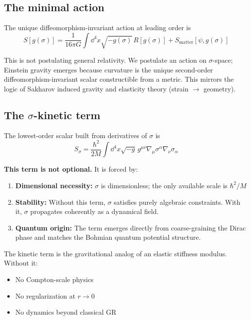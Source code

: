 \documentclass[11pt,a4paper]{article}
\theoremstyle{definition}
\theoremstyle{remark}
\begin{document}
	\subsection{The minimal action}
	
	The unique diffeomorphism-invariant action at leading order is
	\begin{equation}
		S[g(\sigma)] = \frac{1}{16\pi G}\int \dd^4x \sqrt{-g(\sigma)} \, R[g(\sigma)] + S_{\text{matter}}[\psi, g(\sigma)]
		\label{eq:minimal_action}
	\end{equation}
	
	This is not postulating general relativity. We postulate an action on $\sigma$-space; Einstein gravity emerges because curvature is the unique second-order diffeomorphism-invariant scalar constructible from a metric. This mirrors the logic of Sakharov induced gravity and elasticity theory (strain $\to$ geometry).
	
	\subsection{The $\sigma$-kinetic term}
	
	The lowest-order scalar built from derivatives of $\sigma$ is
	\begin{equation}
		S_\sigma = \frac{\hbar^2}{2M}\int \dd^4x \sqrt{-g} \, g^{\mu\nu} \nabla_\mu \sigma^\alpha \nabla_\nu \sigma_\alpha
		\label{eq:sigma_kinetic}
	\end{equation}
	
	\textbf{This term is not optional.} It is forced by:
	\begin{enumerate}
		\item \textbf{Dimensional necessity:} $\sigma$ is dimensionless; the only available scale is $\hbar^2/M$
		\item \textbf{Stability:} Without this term, $\sigma$ satisfies purely algebraic constraints. With it, $\sigma$ propagates coherently as a dynamical field.
		\item \textbf{Quantum origin:} The term emerges directly from coarse-graining the Dirac phase and matches the Bohmian quantum potential structure.
	\end{enumerate}
	
	The kinetic term is the gravitational analog of an elastic stiffness modulus. Without it:
	\begin{itemize}
		\item No Compton-scale physics
		\item No regularization at $r \to 0$
		\item No dynamics beyond classical GR
	\end{itemize}
	
\end{document}
